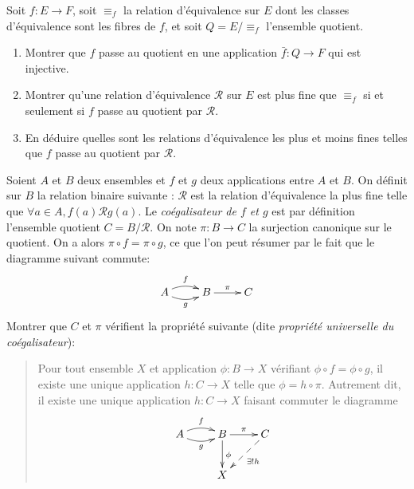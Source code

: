 \begin{exercice}
Soit $f : E\to F$, soit $\equiv_f$ la relation d'équivalence sur $E$ dont les classes d'équivalence sont les fibres de $f$, et soit $Q = E/\equiv_f$ l'ensemble quotient. 

\begin{enumerate}
\item Montrer que $f$ passe au quotient en une application $\bar f : Q\to F$ qui est injective.
\item Montrer qu'une relation d'équivalence $\mathcal R$ sur $E$ est plus fine que $\equiv_f$ si et seulement si $f$ passe au quotient par $\mathcal R$.
\item En déduire quelles sont les relations d'équivalence les plus et moins fines telles que $f$ passe au quotient par $\mathcal R$.
\end{enumerate}
\end{exercice}

\begin{exercice}[Coégalisateur]
Soient $A$ et $B$ deux ensembles et $f$ et $g$ deux applications entre $A$ et $B$. On définit sur $B$ la relation binaire suivante : $\mathcal R$ est la relation d'équivalence la plus fine telle que $\forall a\in A, f(a)\mathcal R g(a)$. Le \emph{coégalisateur de $f$ et $g$} est par définition l'ensemble quotient $C = B/\mathcal R$. On note $\pi : B \to C$ la surjection canonique sur le quotient. On a alors $\pi\circ f = \pi \circ g$, ce que l'on peut résumer par le fait que le diagramme suivant commute:
\[
\xymatrix{
 A\ar@/^/[r] ^{f} \ar@/_/[r]_{g} & B \ar[r]^{\pi} & C
}
\]
Montrer que $C$ et $\pi$ vérifient la propriété suivante (dite \emph{propriété universelle du coégalisateur}):
\begin{quote}
Pour tout ensemble $X$ et application $\phi : B \to X$ vérifiant $\phi\circ f = \phi\circ g$,  il existe une unique application $h : C\to X$ telle que $\phi = h \circ \pi $. Autrement dit, il existe une unique application $h : C\to X$ faisant commuter le diagramme 
\[
\xymatrix{
 A\ar@/^/[r] ^{f} \ar@/_/[r]_{g} & B \ar[r]^{\pi} \ar[d]^{\phi}& C\ar@{-->}[dl]^{\exists!h}\\
 & X & 
}
\]
\end{quote}
\end{exercice}






